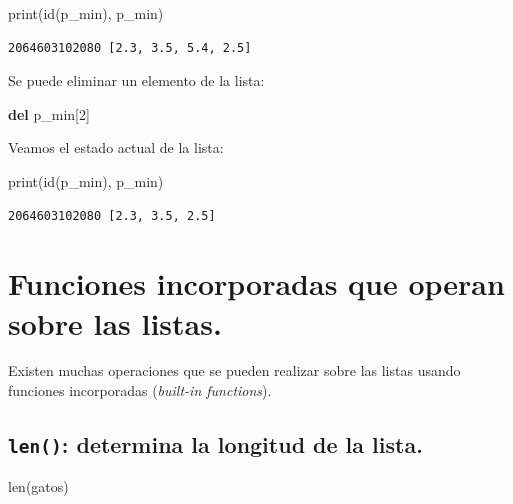 \documentclass[
  spanish,
  letterpaper,
]{scrbook}
\newenvironment{Shaded}{\begin{snugshade}}{\end{snugshade}}
\newcommand{\BuiltInTok}[1]{\textcolor[rgb]{0.00,0.23,0.31}{#1}}
\newcommand{\DecValTok}[1]{\textcolor[rgb]{0.68,0.00,0.00}{#1}}
\newcommand{\KeywordTok}[1]{\textcolor[rgb]{0.00,0.23,0.31}{\textbf{#1}}}
\newcommand{\NormalTok}[1]{\textcolor[rgb]{0.00,0.23,0.31}{#1}}
\theoremstyle{definition}
\theoremstyle{remark}
\begin{document}
\begin{Shaded}
\begin{Highlighting}[]
\BuiltInTok{print}\NormalTok{(}\BuiltInTok{id}\NormalTok{(p\_min), p\_min) }
\end{Highlighting}
\end{Shaded}

\begin{verbatim}
2064603102080 [2.3, 3.5, 5.4, 2.5]
\end{verbatim}

Se puede eliminar un elemento de la lista:

\begin{Shaded}
\begin{Highlighting}[]
\KeywordTok{del}\NormalTok{ p\_min[}\DecValTok{2}\NormalTok{] }
\end{Highlighting}
\end{Shaded}

Veamos el estado actual de la lista:

\begin{Shaded}
\begin{Highlighting}[]
\BuiltInTok{print}\NormalTok{(}\BuiltInTok{id}\NormalTok{(p\_min), p\_min) }
\end{Highlighting}
\end{Shaded}

\begin{verbatim}
2064603102080 [2.3, 3.5, 2.5]
\end{verbatim}

\section{Funciones incorporadas que operan sobre las
listas.}\label{funciones-incorporadas-que-operan-sobre-las-listas.}

Existen muchas operaciones que se pueden realizar sobre las listas
usando funciones incorporadas (\emph{built-in functions}).

\subsection{\texorpdfstring{\texttt{len()}: determina la longitud de la
lista.}{len(): determina la longitud de la lista.}}\label{len-determina-la-longitud-de-la-lista.}

\begin{Shaded}
\begin{Highlighting}[]
\BuiltInTok{len}\NormalTok{(gatos) }
\end{Highlighting}
\end{Shaded}
\end{document}

